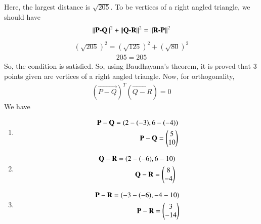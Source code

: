 \documentclass[journal,12pt,twocolumn]{IEEEtran}
\begin{document}
Here, the largest distance is $\sqrt{205}$. To be vertices of a right angled triangle, we should have 
\begin{align}
  \left\lVert\textbf{P-Q}\right\rVert^2 + \left\lVert\textbf{Q-R}\right\rVert^2 = \left\lVert\textbf{R-P}\right\rVert^2
\end{align}
\begin{align}
  (\sqrt{205})^2 = (\sqrt{125})^2 + (\sqrt{80})^2
\end{align}
\begin{align}
  205 = 205
\end{align}
So, the condition is satisfied. 
So, using Baudhayana's theorem, it is proved that 3 points given are vertices of a right angled triangle. 
Now, for orthogonality, 
\begin{align}
    (\vec{P-Q})^T(\vec{Q-R}) = 0
\end{align}
We have 
\begin{enumerate}
    
    \item \begin{align}
    \mathbf{P-Q} = (2-(-3), 6-(-4))
\\
\mathbf{P-Q} = \begin{pmatrix}
5\\
10 
\end{pmatrix}
\end{align}
    \item \begin{align}
    \mathbf{Q-R} = (2-(-6), 6-10)
\\
\mathbf{Q-R} = \begin{pmatrix}
8\\
-4 
\end{pmatrix}
\end{align}
\item \begin{align}
    \mathbf{P-R} = (-3-(-6), -4-10)
\\
\mathbf{P-R} = \begin{pmatrix}
3\\
-14 
\end{pmatrix}
\end{align}
\end{enumerate}
\end{document}
